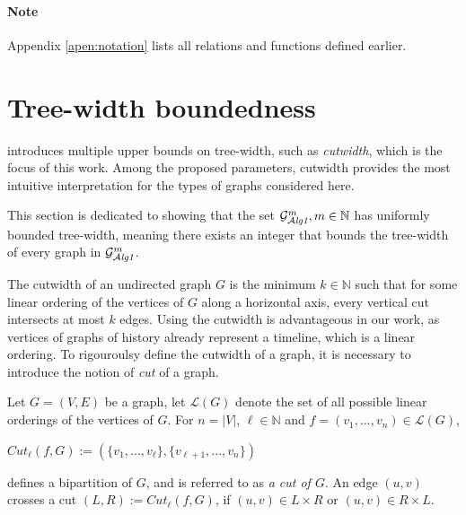 \documentclass[12pt]{article}
\begin{document}
\paragraph{Note} Appendix \ref{apen:notation} lists all relations and functions defined earlier.


\section{Tree-width boundedness}
\label{sec:proof}

\cite{ClassOfGraphsBoundedTreewidth} introduces multiple upper bounds on tree-width, such as \textsl{cutwidth}, which is the focus of this work. Among the proposed parameters, cutwidth provides the most intuitive interpretation for the types of graphs considered here.

This section is dedicated to showing that the set $\mathcal{G}_{\mathcal{A}\emph{lg1}}^m,m\in\mathbb{N}$ has uniformly bounded tree-width, meaning there exists an integer that bounds the tree-width of every graph in $\mathcal{G}_{\mathcal{A}\emph{lg1}}^m$.

The cutwidth of an undirected graph $G$ is the minimum \mbox{$k \in \mathbb{N}$} such that for some linear ordering of the vertices of ${G}$ along a horizontal axis, every vertical cut intersects at most $k$ edges. 
Using the cutwidth is advantageous in our work, as vertices of graphs of history already represent a timeline, which is a linear ordering. 
To rigouroulsy define the cutwidth of a graph, it is necessary to introduce the notion of \textsl{cut} of a graph. 

\begin{nameddefinition}


Let $G=(V,E)$ be a graph, let $\mathscr{L}(G)$ denote the set of all possible linear orderings of the vertices of $G$. For $n=|V|$, $\ell\in\mathbb{N}$ and $f=(v_1,...,v_n)\in\mathscr{L}(G)$,

\begin{center}
$Cut_\ell(f,G):=(\{v_1,...,v_\ell\},\{v_{\ell+1},...,v_n\})$
\end{center}
defines a bipartition of $G$, and is referred to as \textsl{a cut of $G$}. An edge $(u,v)$ crosses a cut \mbox{$(L,R):=Cut_\ell(f,G)$}, if \mbox{$(u,v) \in L\times R$} or \mbox{$(u,v)\in R\times L$}. 

\end{nameddefinition}
\end{document}
